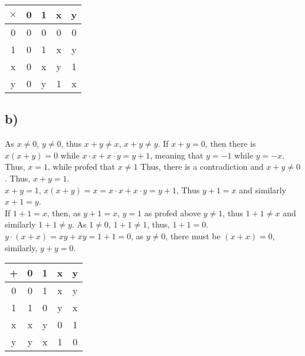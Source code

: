 \documentclass{article}
\begin{document}
\begin{table*}[h]
    \centering
    \begin{tabular}{|c|c|c|c|c|}
        \hline
        \(\times\)&0&1&x&y\\ \hline
        0&0&0&0&0\\ \hline
        1&0&1&x&y\\ \hline
        x&0&x&y&1\\ \hline
        y&0&y&1&x\\ \hline
    \end{tabular}
\end{table*}
\newpage
\subsection*{b)}
As \(x\neq 0\), \(y\neq 0\), thus \(x+y\neq x\), \(x+y\neq y\). If \(x+y=0\), then there is
\(x(x+y)=0\) while \(x\cdot x + x\cdot y = y+1\), meaning that \(y=-1\) while \(y=-x\). Thus, \(x=1\), while profed that \(x\neq 1\)
Thus, there is a contradiction and \(x+y\neq 0\). Thus, \(x+y=1\).\\
\(x+y=1\), \(x(x+y)=x=x\cdot x + x\cdot y = y+1\), Thus \(y+1=x\) and similarly \( x+1 = y\).\\
If \(1+1 = x\), then, as \(y+1=x\), \(y=1\) as profed above \(y\neq1\), thus \(1+1\neq x\) and similarly \(1+1\neq y\). As \(1\neq 0\), \(1+1\neq 1\),
thus, \(1+1=0\).\\
\(y\cdot(x+x)=xy+xy=1+1=0\), as \(y\neq0\), there must be \((x+x)=0\), similarly, \(y+y=0\).
\begin{table*}[h]
    \centering
    \begin{tabular}{|c|c|c|c|c|}
        \hline
        +&0&1&x&y\\ \hline
        0&0&1&x&y\\ \hline
        1&1&0&y&x\\ \hline
        x&x&y&0&1\\ \hline
        y&y&x&1&0\\ \hline
    \end{tabular}
\end{table*}
\end{document}
